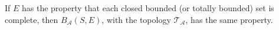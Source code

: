 If $E$ has the property that each closed bounded (or totally bounded) set is complete, then $B_{\mathcal{A}}(S,E)$, with the topology $\mathcal{T}_{\mathcal{A}}$, has the same property.
